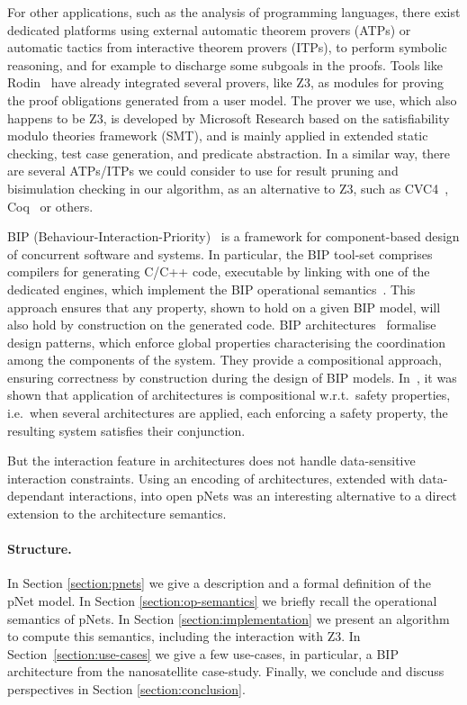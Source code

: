 \documentclass[smallcondensed]{svjour3}
\newcommand{\ie}[1][\ ]{i.e.#1}
\newcommand{\wrt}[1][\ ]{w.r.t.#1}
\begin{document}
For other applications, such as the analysis of 
programming languages, there exist dedicated platforms using
external automatic theorem 
provers (ATPs) or automatic tactics from interactive theorem
provers (ITPs), to perform symbolic reasoning, and for example to
discharge some subgoals in the proofs.
Tools like Rodin~\cite{deharbe2013,deharbe2014} have
already integrated several provers, like Z3, as modules for proving
the proof obligations generated from a user model. 
The prover we use, which also happens to be Z3, is developed by Microsoft Research
based on the satisfiability modulo 
theories framework (SMT), and is mainly applied in extended static checking, test case
generation, and predicate abstraction.
In a similar way, there are several ATPs/ITPs we could consider to use for
result pruning and bisimulation checking in our algorithm, as an
alternative to Z3, such as CVC4~\cite{barrett:CAV2011},
Coq~\cite{armand:CPP2011} or others. 

BIP
(Behaviour-Interaction-Priority)~\cite{bip} is a framework for 
component-based design of concurrent software and systems.  In
particular, the BIP tool-set comprises compilers for generating C/C++
code, executable by linking with one of the dedicated engines, which
implement the BIP operational semantics~\cite{BarBliu15-offer-scico}.  This
approach ensures that any property, shown to hold on a given BIP
model, will also hold by construction on the generated code.
BIP architectures~\cite{AttieBBJS16-architectures-faoc} formalise
design patterns, which enforce global properties 
characterising the coordination among the components of the
system. They provide a compositional approach, ensuring
correctness by construction during the design of BIP models.
In~\cite{AttieBBJS16-architectures-faoc}, it was shown that
application of architectures is compositional \wrt safety properties,
\ie when several architectures are applied, each enforcing a safety
property, the resulting system satisfies their conjunction.

But the interaction feature in architectures does not handle
data-sensitive interaction constraints. Using an encoding of
architectures, extended with data-dependant interactions, into open
pNets was an interesting alternative to a direct extension to the
architecture semantics.

\paragraph{Structure.}
In Section
\ref{section:pnets} we give a description and a formal definition of
the pNet model. 
In Section \ref{section:op-semantics} we briefly recall  the operational semantics
of pNets.
In Section \ref{section:implementation} we present an algorithm to compute this semantics, including the interaction with Z3.
In Section~\ref{section:use-cases} we give a few use-cases, in particular, a BIP
architecture from the nanosatellite case-study. 
Finally, we conclude and discuss perspectives in Section
\ref{section:conclusion}. 
\end{document}
